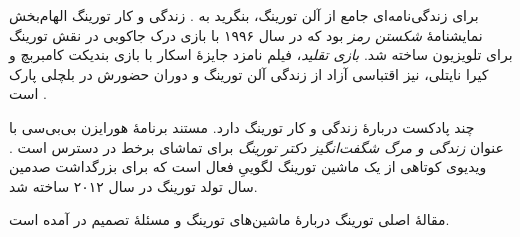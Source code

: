 \documentclass[../../../include/open-logic-section]{subfiles}
\begin{document}
\begin{reading}
برای زندگی‌نامه‌ای جامع از آلن تورینگ، بنگرید به \citet{Hodges2014}.
زندگی و کار تورینگ الهام‌بخش نمایشنامهٔ \emph{شکستن رمز} بود که در سال
۱۹۹۶ با بازی درک جاکوبی در نقش تورینگ برای تلویزیون ساخته شد.
\emph{بازی تقلید}، فیلم نامزد جایزهٔ اسکار با بازی بندیکت کامبربچ و کیرا
نایتلی، نیز اقتباسی آزاد از زندگی آلن تورینگ و دوران حضورش در بلچلی پارک
است \citep{Imitation2014}.

\citet{Radiolab2012} چند پادکست دربارهٔ زندگی و کار تورینگ دارد. مستند
برنامهٔ هورایزن بی‌بی‌سی با عنوان \emph{زندگی و مرگ شگفت‌انگیز دکتر
تورینگ} برای تماشای برخط در دسترس است \citep{Sykes1992}.
\citep{Theelen2012} ویدیوی کوتاهی از یک ماشین تورینگ لگوییِ فعال است که
برای بزرگداشت صدمین سال تولد تورینگ در سال ۲۰۱۲ ساخته شد.

مقالهٔ اصلی تورینگ دربارهٔ ماشین‌های تورینگ و مسئلهٔ تصمیم در
\citet{Turing1937} آمده است.
\end{reading}
\end{document}

